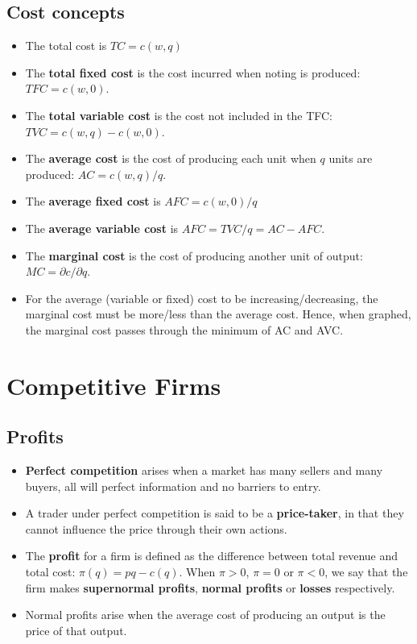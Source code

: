 \documentclass[a4paper]{article}
\begin{document}
\subsection{Cost concepts}
\begin{itemize}
    \item The total cost is $TC = c(w, q)$
    \item The \textbf{total fixed cost} is the cost incurred when noting is produced: $TFC = c(w, 0)$.
    \item The \textbf{total variable cost} is the cost not included in the TFC: $TVC = c(w,q) - c(w, 0)$. 
    \item The \textbf{average cost} is the cost of producing each unit when $q$ units are produced: $AC = c(w, q)/q$.
    \item The \textbf{average fixed cost} is $AFC = c(w, 0)/q$
    \item The \textbf{average variable cost} is $AFC = TVC/q = AC - AFC$.
    \item The \textbf{marginal cost} is the cost of producing another unit of output: $MC = \partial c / \partial q$. 
    \item For the average (variable or fixed) cost to be increasing/decreasing, the marginal cost must be more/less than the average cost. Hence, when graphed, the marginal cost passes through the minimum of AC and AVC.
\end{itemize}

\section{Competitive Firms}
\subsection{Profits}
\begin{itemize}
    \item \textbf{Perfect competition} arises when a market has many sellers and many buyers, all will perfect information and no barriers to entry.
    \item A trader under perfect competition is said to be a \textbf{price-taker}, in that they cannot influence the price through their own actions.
    \item The \textbf{profit} for a firm is defined as the difference between total revenue and total cost: $\pi(q) = pq - c(q)$. When $\pi > 0$, $\pi = 0$ or $\pi < 0$, we say that the firm makes \textbf{supernormal profits}, \textbf{normal profits} or \textbf{losses} respectively.
    \item Normal profits arise when the average cost of producing an output is the price of that output.
\end{itemize}
\end{document}
